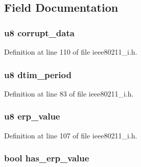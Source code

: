 \subsection{Field Documentation}
\hypertarget{structieee80211__bss_ae66fd8cebf5dbe25a9e67d233f7fb8a1}{
\subsubsection[{corrupt\-\_\-data}]{\setlength{\rightskip}{0pt plus 5cm}u8 corrupt\-\_\-data}}\label{structieee80211__bss_ae66fd8cebf5dbe25a9e67d233f7fb8a1}


Definition at line 110 of file ieee80211\-\_\-i.\-h.

\hypertarget{structieee80211__bss_af039d096de0e0339234f5dd273cac9cb}{
\subsubsection[{dtim\-\_\-period}]{\setlength{\rightskip}{0pt plus 5cm}u8 dtim\-\_\-period}}\label{structieee80211__bss_af039d096de0e0339234f5dd273cac9cb}


Definition at line 83 of file ieee80211\-\_\-i.\-h.

\hypertarget{structieee80211__bss_aa6fc4ecdee2d9c7a81031f23f77e8f6f}{
\subsubsection[{erp\-\_\-value}]{\setlength{\rightskip}{0pt plus 5cm}u8 erp\-\_\-value}}\label{structieee80211__bss_aa6fc4ecdee2d9c7a81031f23f77e8f6f}


Definition at line 107 of file ieee80211\-\_\-i.\-h.

\hypertarget{structieee80211__bss_a99d04a59fd3ef9124414f0c8b3a49f12}{
\subsubsection[{has\-\_\-erp\-\_\-value}]{\setlength{\rightskip}{0pt plus 5cm}bool has\-\_\-erp\-\_\-value}}\label{structieee80211__bss_a99d04a59fd3ef9124414f0c8b3a49f12}


